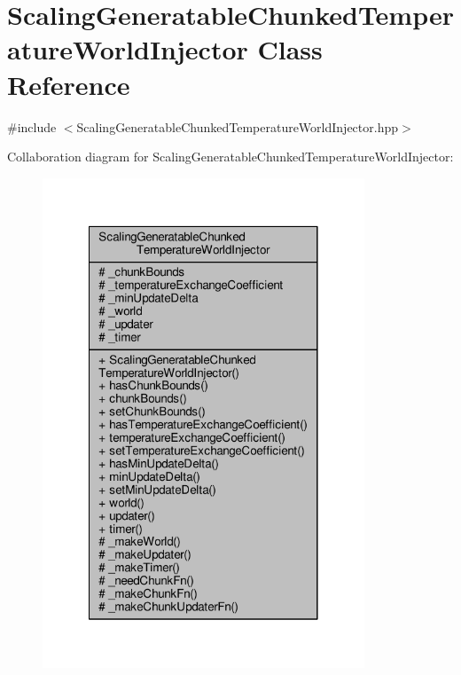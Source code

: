 \hypertarget{class_scaling_generatable_chunked_temperature_world_injector}{\section{Scaling\-Generatable\-Chunked\-Temperature\-World\-Injector Class Reference}
\label{class_scaling_generatable_chunked_temperature_world_injector}
}


{\ttfamily \#include $<$Scaling\-Generatable\-Chunked\-Temperature\-World\-Injector.\-hpp$>$}



Collaboration diagram for Scaling\-Generatable\-Chunked\-Temperature\-World\-Injector\-:
\nopagebreak
\begin{figure}[H]
\begin{center}
\leavevmode
\includegraphics[width=272pt]{class_scaling_generatable_chunked_temperature_world_injector__coll__graph}
\end{center}
\end{figure}
